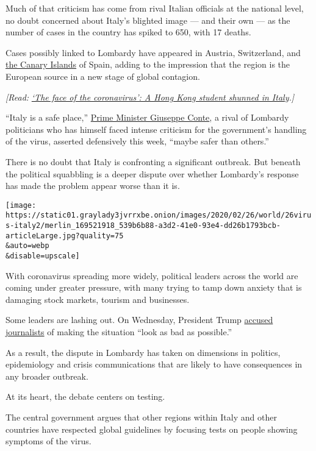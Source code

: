 Much of that criticism has come from rival Italian officials at the
national level, no doubt concerned about Italy's blighted image --- and
their own --- as the number of cases in the country has spiked to 650,
with 17 deaths.

Cases possibly linked to Lombardy have appeared in Austria, Switzerland,
and
\href{https://www.nytimes3xbfgragh.onion/2020/02/25/world/europe/spain-coronavirus-hotel-canary.html}{the
Canary Islands} of Spain, adding to the impression that the region is
the European source in a new stage of global contagion.

\emph{{[}Read:}
\href{http://www.nytimes3xbfgragh.onion/2020/03/02/world/asia/coronavirus-italy-racism.html}{\emph{`The
face of the coronavirus': A Hong Kong student shunned in
Italy}}\emph{.{]}}

``Italy is a safe place,''
\href{https://www.nytimes3xbfgragh.onion/2019/08/29/world/europe/italy-conte-government-salvini.html}{Prime
Minister Giuseppe Conte}, a rival of Lombardy politicians who has
himself faced intense criticism for the government's handling of the
virus, asserted defensively this week, ``maybe safer than others.''

There is no doubt that Italy is confronting a significant outbreak. But
beneath the political squabbling is a deeper dispute over whether
Lombardy's response has made the problem appear worse than it is.

\texttt{[image: https://static01.graylady3jvrrxbe.onion/images/2020/02/26/world/26virus-italy2/merlin\_169521918\_539b6b88-a3d2-41e0-93e4-dd26b1793bcb-articleLarge.jpg?quality=75\\\&auto=webp\\\&disable=upscale]}

With coronavirus spreading more widely, political leaders across the
world are coming under greater pressure, with many trying to tamp down
anxiety that is damaging stock markets, tourism and businesses.

Some leaders are lashing out. On Wednesday, President Trump
\href{https://www.nytimes3xbfgragh.onion/2020/02/26/us/politics/trump-coronavirus-cdc.html}{accused
journalists} of making the situation ``look as bad as possible.''

As a result, the dispute in Lombardy has taken on dimensions in
politics, epidemiology and crisis communications that are likely to have
consequences in any broader outbreak.

At its heart, the debate centers on testing.

The central government argues that other regions within Italy and other
countries have respected global guidelines by focusing tests on people
showing symptoms of the virus.

